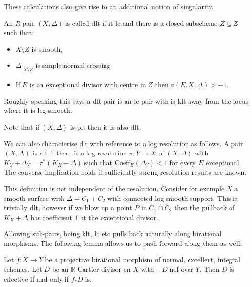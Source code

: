 These calculations also give rise to an additional notion of singularity.

\begin{definition}
	An $R$ pair $(X,\Delta)$ is called dlt if it lc and there is a closed subscheme $Z \subseteq Z$ such that:
	
	\begin{itemize}
		\item $X\setminus Z$ is smooth, 
		\item $\Delta|_{X\setminus Z}$ is simple normal crossing
		\item If $E$ is an exceptional divisor with centre in $Z$ then $a(E,X,\Delta) > -1$.
	\end{itemize}
	
	
	 
\end{definition}

Roughly speaking this says a dlt pair is an lc pair with is klt away from the locus where it is log smooth.

Note that if $(X,\Delta)$ is plt then it is also dlt. 

\begin{remark}
	
	We can also characterise dlt with reference to a log resolution as follows. A pair $(X,\Delta)$ is dlt if there is a log resolution $\pi:Y \to X$ of $(X,\Delta)$ with $K_{Y}+\Delta_{Y}=\pi^{*}(K_{X}+\Delta)$ such that $\text{Coeff}_{E}(\Delta_{Y}) < 1$ for every $E$ exceptional. The converse implication holds if sufficiently strong resolution results are known. 
	
	This definition is not independent of the resolution. Consider for example $X$ a smooth surface with $\Delta=C_{1}+C_{2}$ with connected log smooth support. This is trivially dlt, however if we blow up a point $P$ in $C_{1}\cap C_{2}$ then the pullback of $K_{X}+\Delta$ has coefficient $1$ at the exceptional divisor.

\end{remark}

Allowing sub-pairs, being klt, lc etc pulls back naturally along birational morphisms. The following lemma allows us to push forward along them as well.

\begin{lemma}\cite[Lemma 2.14]{bhatt2020}
	Let $f:X \to Y$ be a projective birational morphism of normal, excellent, integral schemes. Let $D$ be an $\mathbb{R}$ Cartier divisor on $X$ with $-D$ nef over $Y$. Then $D$ is effective if and only if $f_{*}D$ is.
\end{lemma}

